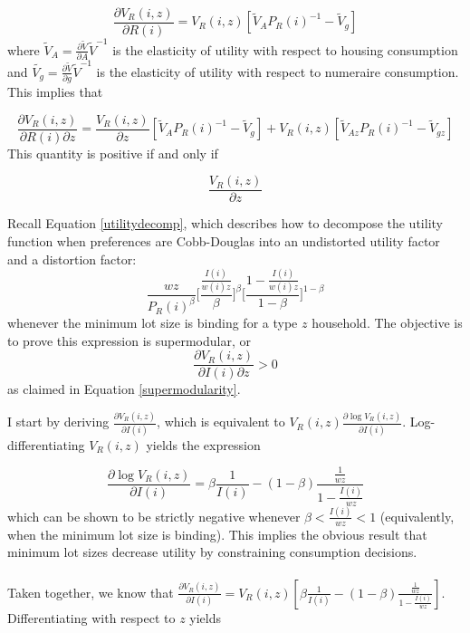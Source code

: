 \documentclass[12pt]{article}
\begin{document}
	\begin{equation*}
		\frac{\partial V_{R}(i, z)}{\partial R(i)} = V_{R}(i, z)[\tilde{V}_{A}P_{R}(i)^{-1} - \tilde{V}_{g}]
	\end{equation*}
	where $\tilde{V}_{A} = \frac{\partial \tilde{V}}{\partial A}\tilde{V}^{-1}$ is the elasticity of utility with respect to housing consumption and $\tilde{V_{g}} = \frac{\partial \tilde{V}}{\partial g}\tilde{V}^{-1}$ is the elasticity of utility with respect to numeraire consumption. This implies that 
	
	\begin{equation*}
		\frac{\partial V_{R}(i, z)}{\partial R(i)\partial z} = \frac{V_{R}(i, z)}{\partial z}[\tilde{V}_{A}P_{R}(i)^{-1} - \tilde{V}_{g}] + V_{R}(i, z)[\tilde{V}_{Az}P_{R}(i)^{-1} - \tilde{V}_{gz}]
	\end{equation*}
	This quantity is positive if and only if 
	
	\begin{equation*}
		\frac{V_{R}(i, z)}{\partial z}
	\end{equation*}
	
	\clearpage
	
	Recall Equation \eqref{utilitydecomp}, which describes how to decompose the utility function when preferences are Cobb-Douglas into an undistorted utility factor and a distortion factor: $$\frac{wz}{P_{R}(i)^{\beta}}\biggl[\frac{\frac{I(i)}{w(i)z}}{\beta}\biggl]^{\beta}\biggl[\frac{1- \frac{I(i)}{w(i)z}}{1-\beta}\biggl]^{1 - \beta}$$
	whenever the minimum lot size is binding for a type $z$ household. The objective is to prove this expression is supermodular, or $$\frac{\partial V_{R}(i, z)}{\partial I(i) \partial z } > 0$$ as claimed in Equation \eqref{supermodularity}.  
	
	I start by deriving $\frac{\partial V_{R}(i, z)}{\partial I(i)}$, which is equivalent to $V_{R}(i, z) \frac{\partial \log V_{R}(i, z)}{\partial I(i)}$. Log-differentiating $V_{R}(i, z)$ yields the expression 
	
	$$\frac{\partial \log V_{R}(i, z)}{\partial I(i)} = \beta\frac{1}{I(i)} - (1-\beta)\frac{\frac{1}{wz}}{1 - \frac{I(i)}{wz}} $$
	which can be shown to be strictly negative whenever $\beta < \frac{I(i)}{wz} < 1$ (equivalently, when the minimum lot size is binding). This implies the obvious result that minimum lot sizes decrease utility by constraining consumption decisions. 
	\paragraph*{}
	Taken together, we know that $\frac{\partial V_{R}(i, z)}{\partial I(i)} = V_{R}(i, z)[\beta\frac{1}{I(i)} - (1-\beta)\frac{\frac{1}{wz}}{1 - \frac{I(i)}{wz}}]$. Differentiating with respect to $z$ yields 
	
\end{document}
